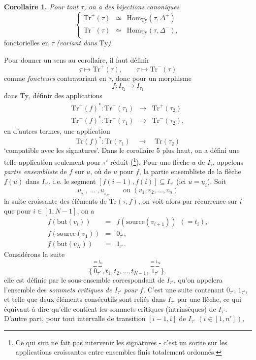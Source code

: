 \documentclass[11pt]{article}
\newcommand{\printedpage}[1]{\if\relax\detokenize{#1}\relax\else\marginpar{\raggedright\footnotesize p.~#1}\fi}
\newcommand{\msp}[1]{\marginpar{\raggedright\footnotesize [#1]}}
\newcommand{\Hom}{\mathrm{Hom}}
\newcommand{\uTy}{\underline{\mathrm{Ty}}}
\newcommand{\Tr}{\mathrm{Tr}}
\begin{document}
\textbf{Corollaire 1.} \textit{Pour tout $\tau$, on a des bijections canoniques}
\[
\left\{
\begin{array}{lcl}
\Tr^+(\tau) & \simeq & \Hom_{\uTy}(\tau, \Delta^+) \\
\Tr^-(\tau) & \simeq & \Hom_{\uTy}(\tau, \Delta^-),
\end{array}
\right.
\]
fonctorielles en $\tau$ \textit{(variant dans} $\uTy$\textit{).}

\printedpage{26}

Pour donner un sens au corollaire, il faut définir
\[
\tau \longmapsto \Tr^+(\tau), \qquad \tau \longmapsto \Tr^-(\tau)
\]
comme \textit{foncteurs} contravariant en $\tau$, donc pour un morphisme
\[
f : I_{\tau_2} \longrightarrow I_{\tau_1}
\]
dans $\uTy$, définir des applications
\msp{page 41}
\[
\begin{array}{rcl}
\Tr^+(f)^* : \Tr^+(\tau_1) & \longrightarrow & \Tr^+(\tau_2) \\
\Tr^-(f)^* : \Tr^-(\tau_1) & \longrightarrow & \Tr^-(\tau_2),
\end{array}
\]
en d'autres termes, une application
\[
\Tr(f)^* : \Tr(\tau_1) \quad \longrightarrow \quad \Tr(\tau_2)
\]
‘compatible avec les signatures’. Dans le corollaire 5 plus haut, on a défini une telle application seulement pour $\tau'$ réduit (\footnote[12]{Ce qui suit ne fait pas intervenir les signatures - c'est un sorite sur les applications croissantes entre ensembles finis totalement ordonnés.}). Pour une flèche $u$ de $I_\tau$, appelons \textit{partie ensembliste} de $f$ sur $u$, où de $u$ pour $f$, la partie ensembliste de la flèche $f(u)$ dans $I_{\tau'}$, i.e. le segment $[f(i-1), f(i)] \subseteq I_{\tau'}$ (ici $u = \underline{u}_i$). Soit %
\[
\underline{u}_{i_1},\ \dots\ ,\underline{u}_{i_N} \qquad \text{ou } (v_1, v_2, \dots, v_n)
\] %
la suite croissante des éléments de $\Tr(\tau, f)$, on voit alors par récurrence sur $i$ que pour $i \in [1, N-1]$, on a
\[
\begin{array}{rcl}
f(\mathrm{but}(v_i)) & = & f(\mathrm{source}(v_{i+1}))\ \ (= t_i), \\
f(\mathrm{source}(v_1)) & = & 0_{\tau'}, \\
f(\mathrm{but}(v_N)) & = & 1_{\tau'}.
\end{array}
\]
Considérons la suite
\[
\{\overbrace{0_{\tau'}}^{= t_0}, t_1, t_2, \dots, t_{N-1}, \overbrace{1_{\tau'}}^{= t_N}\},
\]
elle est définie par le sous-ensemble correspondant de $I_{\tau'}$, qu'on appelera l'ensemble des \textit{sommets critiques de $I_{\tau'}$ pour $f$.} C'est une suite contenant $0_{\tau'}$, $1_{\tau'}$, et telle que deux éléments consécutifs sont reliés dans $I_{\tau'}$ par une flèche, ce qui équivaut à dire qu'elle contient les sommets critiques (intrinsèques) de $I_{\tau'}$. D'autre part, pour tout intervalle de transition $[i-1, i]$ de $I_{\tau'}$ $(i \in [1, n'])$, %
\end{document}
